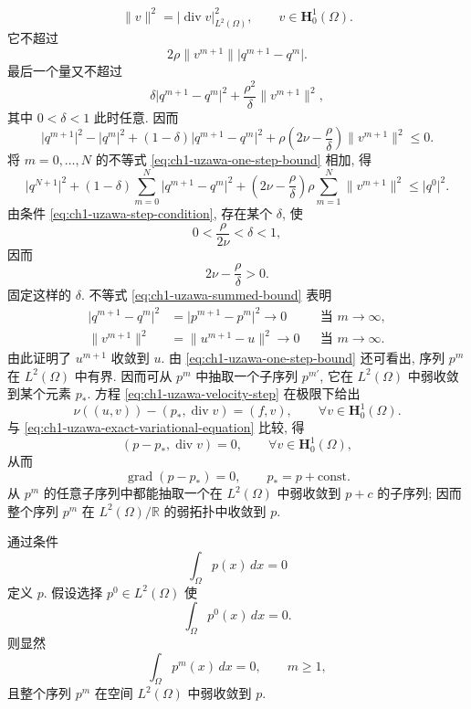 \begin{Proof}
\[
\lVert v\rVert^2=\lvert\operatorname{div}v\rvert_{L^2(\Omega)}^2,
\qquad v\in\mathbf H_0^1(\Omega).
\]
它不超过
\[
2\rho\lVert v^{m+1}\rVert\lvert q^{m+1}-q^m\rvert.
\]
最后一个量又不超过
\[
\delta\lvert q^{m+1}-q^m\rvert^2
+\frac{\rho^2}{\delta}\lVert v^{m+1}\rVert^2,
\]
其中 $0<\delta<1$ 此时任意. 因而
\begin{equation}
\lvert q^{m+1}\rvert^2-\lvert q^m\rvert^2
+(1-\delta)\lvert q^{m+1}-q^m\rvert^2
+\rho\left(2\nu-\frac{\rho}{\delta}\right)\lVert v^{m+1}\rVert^2\leq0.
\label{eq:ch1-uzawa-one-step-bound}
\end{equation}
将 $m=0,\ldots,N$ 的不等式 \eqref{eq:ch1-uzawa-one-step-bound} 相加, 得
\begin{equation}
\lvert q^{N+1}\rvert^2
+(1-\delta)\sum_{m=0}^{N}\lvert q^{m+1}-q^m\rvert^2
+\left(2\nu-\frac{\rho}{\delta}\right)\rho
\sum_{m=1}^{N}\lVert v^{m+1}\rVert^2
\leq\lvert q^0\rvert^2.
\label{eq:ch1-uzawa-summed-bound}
\end{equation}
由条件 \eqref{eq:ch1-uzawa-step-condition}, 存在某个 $\delta$, 使
\[
0<\frac{\rho}{2\nu}<\delta<1,
\]
因而
\[
2\nu-\frac{\rho}{\delta}>0.
\]
固定这样的 $\delta$. 不等式 \eqref{eq:ch1-uzawa-summed-bound} 表明
\begin{equation}
\begin{aligned}
\lvert q^{m+1}-q^m\rvert^2
&=\lvert p^{m+1}-p^m\rvert^2\longrightarrow0
&&\text{当 }m\to\infty,\\
\lVert v^{m+1}\rVert^2
&=\lVert u^{m+1}-u\rVert^2\longrightarrow0
&&\text{当 }m\to\infty.
\end{aligned}
\label{eq:ch1-uzawa-error-convergence}
\end{equation}
由此证明了 $u^{m+1}$ 收敛到 $u$. 由 \eqref{eq:ch1-uzawa-one-step-bound} 还可看出, 序列 $p^m$ 在 $L^2(\Omega)$ 中有界. 因而可从 $p^m$ 中抽取一个子序列 $p^{m'}$, 它在 $L^2(\Omega)$ 中弱收敛到某个元素 $p_*$. 方程 \eqref{eq:ch1-uzawa-velocity-step} 在极限下给出
\[
\nu((u,v))-(p_*,\operatorname{div}v)=(f,v),
\qquad \forall v\in\mathbf H_0^1(\Omega).
\]
与 \eqref{eq:ch1-uzawa-exact-variational-equation} 比较, 得
\[
(p-p_*,\operatorname{div}v)=0,
\qquad \forall v\in\mathbf H_0^1(\Omega),
\]
从而
\[
\operatorname{grad}(p-p_*)=0,
\qquad p_*=p+\mathrm{const}.
\]
从 $p^m$ 的任意子序列中都能抽取一个在 $L^2(\Omega)$ 中弱收敛到 $p+c$ 的子序列; 因而整个序列 $p^m$ 在 $L^2(\Omega)/\mathbb R$ 的弱拓扑中收敛到 $p$.
\end{Proof}

\begin{Remark}
\label{rem:ch1-uzawa-zero-mean-pressure}
通过条件
\[
\int_\Omega p(x)\,dx=0
\]
定义 $p$. 假设选择 $p^0\in L^2(\Omega)$ 使
\[
\int_\Omega p^0(x)\,dx=0.
\]
则显然
\[
\int_\Omega p^m(x)\,dx=0,
\qquad m\geq1,
\]
且整个序列 $p^m$ 在空间 $L^2(\Omega)$ 中弱收敛到 $p$.
\end{Remark}

